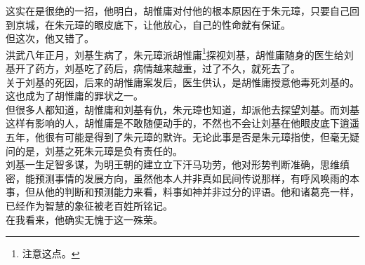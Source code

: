 \begin{multicols}{\theparacolNo}
这实在是很绝的一招，他明白，胡惟庸对付他的根本原因在于朱元璋，只要自己回到京城，在朱元璋的眼皮底下，让他放心，自己的性命就有保证。\\

但这次，他又错了。\\

洪武八年正月，刘基生病了，朱元璋派胡惟庸\footnote{注意这点。}探视刘基，胡惟庸随身的医生给刘基开了药方，刘基吃了药后，病情越来越重，过了不久，就死去了。\\

关于刘基的死因，后来的胡惟庸案发后，医生供认，是胡惟庸授意他毒死刘基的。这也成为了胡惟庸的罪状之一。\\

但很多人都知道，胡惟庸和刘基有仇，朱元璋也知道，却派他去探望刘基。而刘基这样有影响的人，胡惟庸是不敢随便动手的，不然也不会让刘基在他眼皮底下逍遥五年，他很有可能是得到了朱元璋的默许。无论此事是否是朱元璋指使，但毫无疑问的是，刘基之死朱元璋是负有责任的。\\

刘基一生足智多谋，为明王朝的建立立下汗马功劳，他对形势判断准确，思维缜密，能预测事情的发展方向，虽然他本人并非真如民间传说那样，有呼风唤雨的本事，但从他的判断和预测能力来看，料事如神并非过分的评语。他和诸葛亮一样，已经作为智慧的象征被老百姓所铭记。\\

在我看来，他确实无愧于这一殊荣。\\
\ifnum{}
	\end{multicols}
\fi
\newpage

